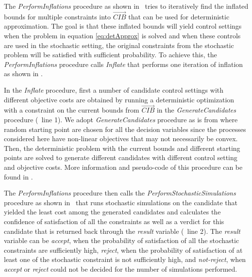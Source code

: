 \documentclass[a4paper, 12pt]{article} %
\begin{document}
The \textit{PerformInflations} procedure as shown in \algoPerfInfl~tries to iteratively find the inflated bounds for multiple constraints into $\overrightarrow{CIB}$ that can be used for deterministic approximation. The goal is that these inflated bounds will yield control settings when the problem in equation \ref{eq:detApprox} is solved and when these controls are used in the stochastic setting, the original constraints from the stochastic problem will be satisfied with sufficient probability.  
To achieve this, the \textit{PerformInflations} procedure calls \textit{Inflate} that performs one iteration of inflation as shown in \algoInflate. 

In the \textit{Inflate} procedure, first a number of candidate control settings with different objective costs are obtained by running a deterministic optimization with a constraint on the current bounds from $\overrightarrow{CIB}$ in the \textit{GenerateCandidates} procedure (\algoInflate~line 1). 
We adopt \textit{GenerateCandidates} procedure as is from \cite{GMU-CS-TR-2017-3} where random starting point are chosen for all the decision variables since the processes considered here have non-linear objectives that may not necessarily be convex. Then, the deterministic problem with the current bounds and different starting points are solved to generate different candidates with different control setting and objective costs. More information and pseudo-code of this procedure can be found in \cite{GMU-CS-TR-2017-3}.


The \textit{PerformInflations} procedure then calls the \textit{PerformStochasticSimulations} procedure as shown in \algoStochSim~that runs stochastic simulations on the candidate that yielded the least cost among the generated candidates and calculates the confidence of satisfaction of all the constraints as well as a verdict for this candidate that is returned back through the \textit{result} variable (\algoInflate~line 2). The \textit{result} variable can be \textit{accept}, when the probability of satisfaction of all the stochastic constraints are sufficiently high, \textit{reject}, when the probability of satisfaction of at least one of the stochastic constraint is not sufficiently high, and \textit{not-reject}, when \textit{accept} or \textit{reject} could not be decided for the number of simulations performed.
\end{document}
